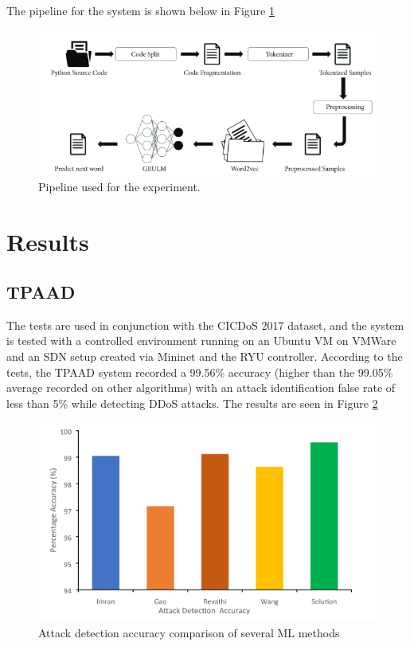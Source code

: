 \documentclass[a4paper, 12pt]{article}
\begin{document}
The pipeline for the system is shown below in Figure \ref{fig:3}

\begin{figure}[H]
    \centering
    \includegraphics[width=0.7\linewidth]{image-pipe.png}
    \caption{Pipeline used for the experiment. \protect{}}
    \label{fig:3}
\end{figure}

\clearpage

\section{Results}

\subsection{TPAAD} 
The tests are used in conjunction with the CICDoS 2017 dataset, and the system is tested with a controlled environment running on an Ubuntu VM on VMWare and an SDN setup created via Mininet and the RYU controller. According to the tests, the TPAAD system recorded a 99.56\% accuracy (higher than the 99.05\% average recorded on other algorithms) with an attack identification false rate of less than 5\% while detecting DDoS attacks. The results are seen in Figure \ref{fig:4} 

\begin{figure}[H]
    \centering
    \includegraphics[width=0.7\linewidth]{image.png}
    \caption{Attack detection accuracy comparison of several ML methods \protect{}}
    \label{fig:4}
\end{figure}
\end{document}
